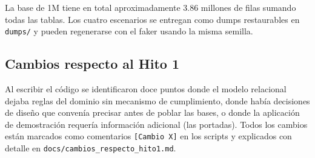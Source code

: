\documentclass[12pt,a4paper]{article}
\begin{document}
La base de 1M tiene en total aproximadamente 3.86 millones de filas sumando
todas las tablas. Los cuatro escenarios se entregan como dumps restaurables en
\texttt{dumps/} y pueden regenerarse con el faker usando la misma semilla.


\subsection{Cambios respecto al Hito 1}
\label{sec:cambios}

Al escribir el código se identificaron doce puntos donde el modelo relacional
dejaba reglas del dominio sin mecanismo de cumplimiento, donde había decisiones
de diseño que convenía precisar antes de poblar las bases, o donde la aplicación
de demostración requería información adicional (las portadas). Todos los cambios
están marcados como comentarios \texttt{[Cambio X]} en los scripts y explicados
con detalle en \texttt{docs/cambios\_respecto\_hito1.md}.
\end{document}
